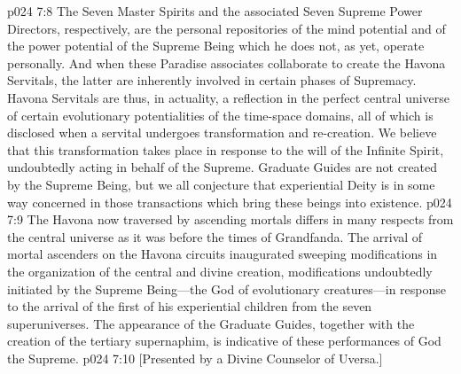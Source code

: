 \pc \vs p024 7:8 The Seven Master Spirits and the associated Seven Supreme Power Directors, respectively, are the personal repositories of the mind potential and of the power potential of the Supreme Being which he does not, as yet, operate personally. And when these Paradise associates collaborate to create the Havona Servitals, the latter are inherently involved in certain phases of Supremacy. Havona Servitals are thus, in actuality, a reflection in the perfect central universe of certain evolutionary potentialities of the time\hyp{}space domains, all of which is disclosed when a servital undergoes transformation and re\hyp{}creation. We believe that this transformation takes place in response to the will of the Infinite Spirit, undoubtedly acting in behalf of the Supreme. Graduate Guides are not created by the Supreme Being, but we all conjecture that experiential Deity is in some way concerned in those transactions which bring these beings into existence.\plusone
\vs p024 7:9 The Havona now traversed by ascending mortals differs in many respects from the central universe as it was before the times of Grandfanda. The arrival of mortal ascenders on the Havona circuits inaugurated sweeping modifications in the organization of the central and divine creation, modifications undoubtedly initiated by the Supreme Being---the God of evolutionary creatures---in response to the arrival of the first of his experiential children from the seven superuniverses. The appearance of the Graduate Guides, together with the creation of the tertiary supernaphim, is indicative of these performances of God the Supreme.
\vsetoff
\vs p024 7:10 [Presented by a Divine Counselor of Uversa.]
